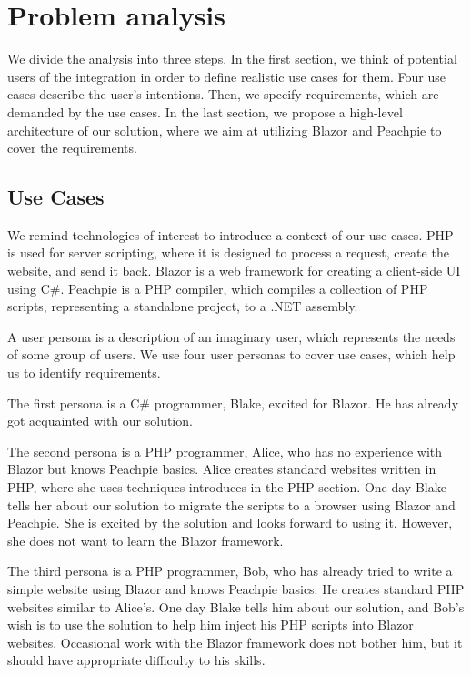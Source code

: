 \chapter{Problem analysis}
We divide the analysis into three steps.
In the first section, we think of potential users of the integration in order to define realistic use cases for them.
Four use cases describe the user's intentions.
Then, we specify requirements, which are demanded by the use cases.
In the last section, we propose a high-level architecture of our solution, where we aim at utilizing Blazor and Peachpie to cover the requirements.

\section{Use Cases}
We remind technologies of interest to introduce a context of our use cases.
PHP is used for server scripting, where it is designed to process a request, create the website, and send it back.
Blazor is a web framework for creating a client-side UI using C\#.
Peachpie is a PHP compiler, which compiles a collection of PHP scripts, representing a standalone project, to a .NET assembly.
\par
A user persona \cite{online:persona} is a description of an imaginary user, which represents the needs of some group of users.
We use four user personas to cover use cases, which help us to identify requirements.
\par
The first persona is a C\# programmer, Blake, excited for Blazor.
He has already got acquainted with our solution.
\par
The second persona is a PHP programmer, Alice, who has no experience with Blazor but knows Peachpie basics.
Alice creates standard websites written in PHP, where she uses techniques introduces in the PHP section.
One day Blake tells her about our solution to migrate the scripts to a browser using Blazor and Peachpie.
She is excited by the solution and looks forward to using it.
However, she does not want to learn the Blazor framework.
\par
The third persona is a PHP programmer, Bob, who has already tried to write a simple website using Blazor and knows Peachpie basics.
He creates standard PHP websites similar to Alice's.
One day Blake tells him about our solution, and Bob's wish is to use the solution to help him inject his PHP scripts into Blazor websites.
Occasional work with the Blazor framework does not bother him, but it should have appropriate difficulty to his skills.
